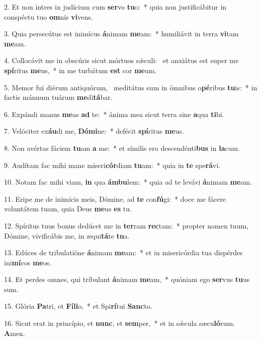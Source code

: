 2. Et non intres in judícium cum \textbf{ser}vo \textbf{tu}o:~*  quia non justificábitur in conspéctu tuo \textbf{om}nis \textbf{vi}vens.\

3. Quia persecútus est inimícus \textbf{á}nimam \textbf{me}am:~*  humiliávit in terra \textbf{vi}tam \textbf{me}am.\

4. Collocávit me in obscúris sicut mórtuos sǽculi: \dag\  et anxiátus est super me \textbf{spí}ritus \textbf{me}us,~*  in me turbátum \textbf{est} cor \textbf{me}um.\

5. Memor fui diérum antiquórum, \dag\  meditátus sum in ómnibus o\textbf{pé}ribus \textbf{tu}is:~*  in factis mánuum tuárum \textbf{me}di\textbf{tá}bar.\

6. Expándi manus \textbf{me}as \textbf{ad} te:~*  ánima mea sicut terra sine \textbf{a}qua \textbf{ti}bi.\

7. Velóciter ex\textbf{áu}di me, \textbf{Dó}\textbf{mi}ne:~*  defécit \textbf{spí}ritus \textbf{me}us.\

8. Non avértas fáciem \textbf{tu}am \textbf{a} me:~*  et símilis ero descendénti\textbf{bus} in \textbf{la}cum.\

9. Audítam fac mihi mane miseri\textbf{cór}diam \textbf{tu}am:~*  quia in \textbf{te} spe\textbf{rá}vi.\

10. Notam fac mihi viam, \textbf{in} qua \textbf{ám}\textbf{bu}lem:~*  quia ad te levávi \textbf{á}nimam \textbf{me}am.\

11. Eripe me de inimícis meis, Dómine, ad \textbf{te} con\textbf{fú}gi:~*  doce me fácere voluntátem tuam, quia Deus \textbf{me}us \textbf{es} tu.\

12. Spíritus tuus bonus dedúcet me in \textbf{ter}ram \textbf{rec}tam:~*  propter nomen tuum, Dómine, vivificábis me, in æqui\textbf{tá}te \textbf{tu}a.\

13. Edúces de tribulatióne \textbf{á}nimam \textbf{me}am:~*  et in misericórdia tua dispérdes ini\textbf{mí}cos \textbf{me}os.\

14. Et perdes omnes, qui tríbulant \textbf{á}nimam \textbf{me}am,~*  quóniam ego \textbf{ser}vus \textbf{tu}us sum.\

15. Glória \textbf{Pa}tri, et \textbf{Fí}\textbf{li}o,~*  et Spi\textbf{rí}tui \textbf{Sanc}to.\

16. Sicut erat in princípio, et \textbf{nunc}, et \textbf{sem}per,~*  et in sǽcula sæcu\textbf{ló}rum. \textbf{A}men.\

